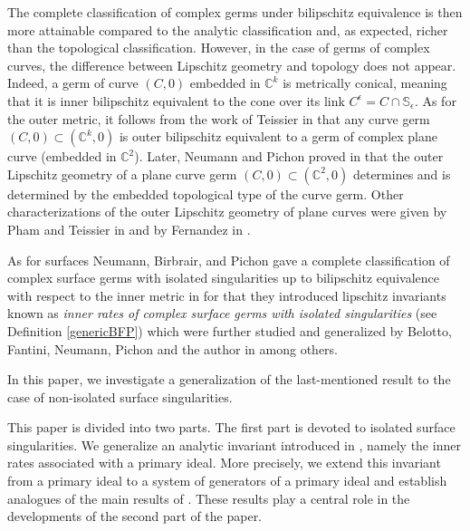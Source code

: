 \documentclass[reqno,dvipsnames,12pt]{amsart}
\begin{document}
 
 
  The complete classification of complex germs under bilipschitz equivalence is then more attainable compared to the analytic classification and, as expected, richer than the topological classification. However, in the case of germs of complex curves, the difference between Lipschitz geometry and topology does not appear. Indeed, a germ of curve $(C,0)$ embedded in $\mathbb{C}^k$ is metrically conical, meaning that it is inner bilipschitz equivalent to the cone over its link $C^{\epsilon} = C \cap \mathbb{S}_{\epsilon}$. As for the outer metric, it follows from the work of Teissier in \cite{Teissier1982} that any curve germ $(C,0) \subset (\mathbb{C}^k,0)$ is outer bilipschitz equivalent to a germ of complex plane curve (embedded in $\mathbb{C}^2$). Later, Neumann and Pichon proved in \cite{NeumannPichon2014} that the outer Lipschitz geometry of a plane curve germ $(C,0) \subset (\mathbb{C}^2,0)$ determines and is determined by the embedded topological type of the curve germ. Other characterizations of the outer Lipschitz geometry of plane curves were given by Pham and Teissier in \cite{phametteissieryalongtemps} and by Fernandez in \cite{Fernandezlipschitz}.




  
  
   As for surfaces Neumann, Birbrair, and Pichon gave a complete classification of complex surface germs with isolated singularities up to bilipschitz equivalence with respect to the inner metric in \cite{BNP}  for that they introduced lipschitz invariants known as  \textit{inner rates of complex surface germs with isolated singularities} (see Definition \ref{genericBFP}) which were further studied and generalized by Belotto, Fantini, Neumann,  Pichon and the author  in \cite{NeumannPichon2017,BFP,yenni1,yenni2} among others. 
   
   In this paper, we investigate a generalization of the last-mentioned result to the case of non-isolated surface singularities.
   
   
   
   
   This paper is divided into two parts. The first part is devoted to isolated surface singularities. We generalize an analytic invariant introduced in \cite{yenni2}, namely the inner rates associated with a primary ideal. More precisely, we extend this invariant from a primary ideal to a system of generators of a primary ideal and establish analogues of the main results of \cite{yenni2}. These results play a central role in the developments of the second part of the paper.
\end{document}
